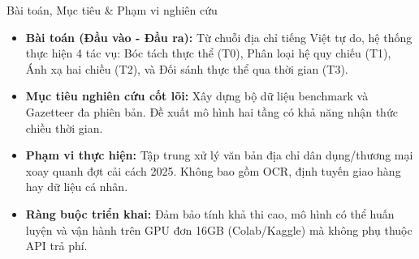 \documentclass[aspectratio=169,9pt]{beamer}
\begin{document}
\begin{frame}{Bài toán, Mục tiêu \& Phạm vi nghiên cứu}
  \vspace{0.15cm}
  \begin{itemize}
    \setlength{\itemsep}{8pt}
    \item \textbf{Bài toán (Đầu vào - Đầu ra):} Từ chuỗi địa chỉ tiếng Việt tự do, hệ thống thực hiện 4 tác vụ: Bóc tách thực thể (T0), Phân loại hệ quy chiếu (T1), Ánh xạ hai chiều (T2), và Đối sánh thực thể qua thời gian (T3).
    \item \textbf{Mục tiêu nghiên cứu cốt lõi:} Xây dựng bộ dữ liệu benchmark và Gazetteer đa phiên bản. Đề xuất mô hình hai tầng có khả năng nhận thức chiều thời gian.
    \item \textbf{Phạm vi thực hiện:} Tập trung xử lý văn bản địa chỉ dân dụng/thương mại xoay quanh đợt cải cách 2025. Không bao gồm OCR, định tuyến giao hàng hay dữ liệu cá nhân.
    \item \textbf{Ràng buộc triển khai:} Đảm bảo tính khả thi cao, mô hình có thể huấn luyện và vận hành trên GPU đơn 16GB (Colab/Kaggle) mà không phụ thuộc API trả phí.
  \end{itemize}
\end{frame}
\end{document}
